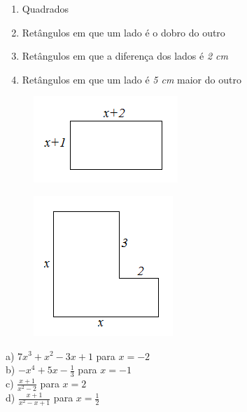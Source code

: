 \begin{enumerate}[label=\thesubsection.\arabic*]

\begin{enumerate}[label=(\textbf{\alph*)}]
\item Quadrados
\item Retângulos em que um lado é o dobro do outro
\item Retângulos em que a diferença dos lados é \textit{2 cm}
\item Retângulos em que um lado é \textit{5 cm} maior do outro
\end{enumerate}

\begin{figure}[h]
  \includegraphics{capitulos/expressoes_algebricas/media/image3.png}
  \centering
\end{figure}

\begin{figure}[h]
  \includegraphics{capitulos/expressoes_algebricas/media/image4.png}
  \centering
\end{figure}




\begin{multicols}{2}\large
a) $7x^3 + x^2 - 3x + 1$ para $x = -2$\\
b) $ - x^4 + 5x - \frac{1}{3}$ para $x = - 1$\\
c) $\frac{x+1}{x^2-2}$ para $x = 2$\\
d) $\frac{x+1}{x^2-x+1}$ para $x=\frac{1}{2}$
\end{multicols}\normalsize

\end{enumerate}

